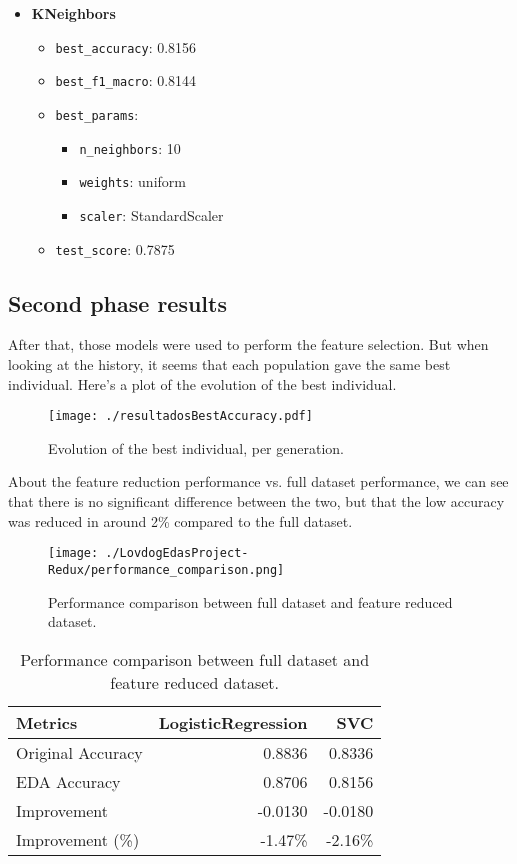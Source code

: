\documentclass[10pt]{IEEEtran}
\begin{document}
\begin{itemize}
    \item \textbf{KNeighbors}
    \begin{itemize}
        \item \texttt{best\_accuracy}: 0.8156
        \item \texttt{best\_f1\_macro}: 0.8144
        \item \texttt{best\_params}:
        \begin{itemize}
            \item \texttt{n\_neighbors}: 10
            \item \texttt{weights}: uniform
            \item \texttt{scaler}: StandardScaler
        \end{itemize}
        \item \texttt{test\_score}: 0.7875
    \end{itemize}

\end{itemize}

\subsection{ Second phase results }

After that, those models were used to perform the feature selection. But
when looking at the history, it seems that each population gave the same best
individual. Here's a plot of the evolution of the best individual.
\begin{figure}[!h]
  \centering
  \texttt{[image: ./resultadosBestAccuracy.pdf]}
  \caption{Evolution of the best individual, per generation.}
  \label{fig:evolution}
\end{figure}

About the feature reduction performance vs. full dataset performance, we can
see that there is no significant difference between the two, but that the low
accuracy was reduced in around 2\% compared to the full dataset.
\begin{figure}[!h]
  \centering
  \texttt{[image: ./LovdogEdasProject-Redux/performance\_comparison.png]}
  \caption{Performance comparison between full dataset and feature reduced dataset.}
  \label{fig:evolution}
\end{figure}


\begin{table}[htbp]
\centering
\caption{Performance comparison between full dataset and feature reduced dataset.}
\label{tab:results_transposed}
\begin{tabular}{l r r}
\toprule
\textbf{Metrics} & \textbf{LogisticRegression} & \textbf{SVC} \\
\midrule
Original Accuracy   & 0.8836 & 0.8336 \\
EDA Accuracy        & 0.8706 & 0.8156 \\
Improvement         & -0.0130 & -0.0180 \\
Improvement (\%)    & -1.47\% & -2.16\% \\
\bottomrule
\end{tabular}
\end{table}
\end{document}
